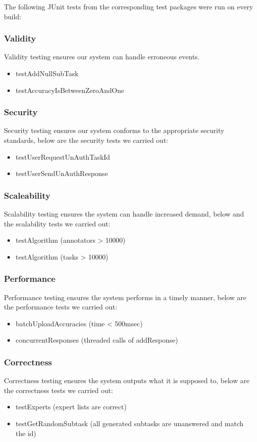 \documentclass[11pt]{article}
\begin{document}
The following JUnit tests from the corresponding test packages were run on every build:

\subsubsection{Validity}
Validity testing ensures our system can handle erroneous events.
\begin{itemize}
\item testAddNullSubTask
\item testAccuracyIsBetweenZeroAndOne
\end{itemize}
\subsubsection{Security}
Security testing ensures our system conforms to the appropriate security standards, below are the security tests we carried out:
\begin{itemize}
\item testUserRequestUnAuthTaskId
\item testUserSendUnAuthResponse
\end{itemize}
\subsubsection{Scaleability}
Scalability testing ensures the system can handle increased demand, below and the scalability tests we carried out:
\begin{itemize}
\item testAlgorithm (annotators > 10000)
\item testAlgorithm (tasks > 10000)
\end{itemize}
\subsubsection{Performance}
Performance testing ensures the system performs in a timely manner, below are the performance tests we carried out: 
\begin{itemize}
\item batchUploadAccuracies (time < 500msec)
\item concurrentResponses (threaded calls of addResponse)
\end{itemize}
\subsubsection{Correctness}
Correctness testing ensures the system outputs what it is supposed to, below are the correctness tests we carried out:
\begin{itemize}
\item testExperts (expert lists are correct)
\item testGetRandomSubtask (all generated subtasks are unanswered and match the id)
\end{itemize}
\end{document}
